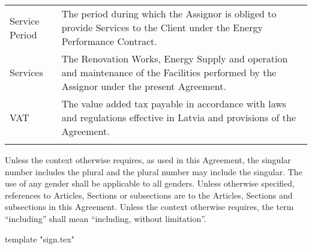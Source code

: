 \documentclass[a4paper]{article}
\begin{document}
\begin{longtabu}{|X|X[2]|}
   \hline

   Service Period & The period during which the Assignor is obliged to
   provide Services to the Client under the Energy Performance
   Contract.\\\tabucline{}

   \hline

   Services & The Renovation Works, Energy Supply and operation and
   maintenance of the Facilities performed by the Assignor under the
   present Agreement.\\\tabucline{}

   \hline

   VAT & The value added tax payable in accordance with laws and
   regulations effective in Latvia and provisions of the Agreement.\\\tabucline{}

 \end{longtabu}

 \vspace{5mm}

 Unless the context otherwise requires, as used in this Agreement, the
 singular number includes the plural and the plural number may include
 the singular. The use of any gender shall be applicable to all
 genders. Unless otherwise specified, references to Articles, Sections
 or subsections are to the Articles, Sections and subsections in this
 Agreement. Unless the context otherwise requires, the term “including”
 shall mean “including, without limitation”. \par

\vspace{5mm}

{{ template "sign.tex"}}
\end{document}
